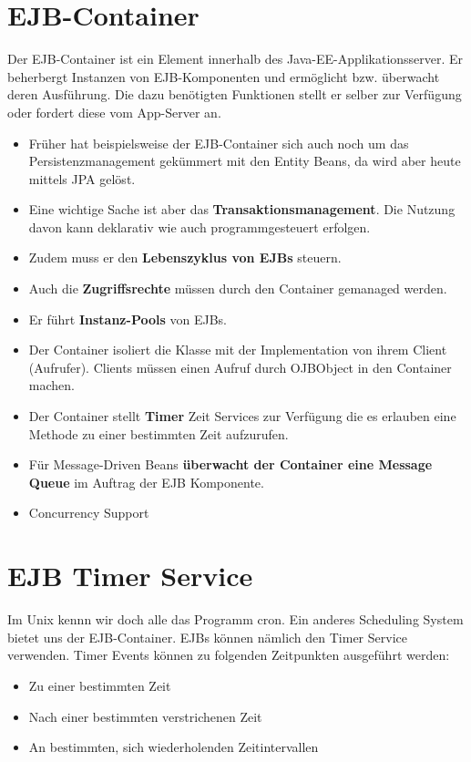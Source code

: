 \section{EJB-Container}
Der EJB-Container ist ein Element innerhalb des Java-EE-Applikationsserver. Er beherbergt Instanzen von EJB-Komponenten und ermöglicht bzw. überwacht deren Ausführung. Die dazu benötigten Funktionen stellt er selber zur Verfügung oder fordert diese vom App-Server an.

\begin{itemize}
	\item Früher hat beispielsweise der EJB-Container sich auch noch um das Persistenzmanagement gekümmert mit den Entity Beans, da wird aber heute mittels JPA gelöst.
	\item Eine wichtige Sache ist aber das \textbf{Transaktionsmanagement}.  Die Nutzung davon kann deklarativ wie auch programmgesteuert erfolgen.
	\item Zudem muss er den \textbf{Lebenszyklus von EJBs} steuern.
	\item Auch die \textbf{Zugriffsrechte} müssen durch den Container gemanaged werden.
	\item Er führt \textbf{Instanz-Pools} von EJBs.
	\item Der Container isoliert die Klasse mit der Implementation von ihrem Client (Aufrufer). Clients müssen einen Aufruf durch OJBObject in den Container machen.
	\item Der Container stellt \textbf{Timer} Zeit Services zur Verfügung die es erlauben eine Methode zu einer bestimmten Zeit aufzurufen.
	\item Für Message-Driven Beans\textbf{ überwacht der Container eine Message Queue }im  Auftrag der EJB Komponente. 
	\item Concurrency Support 
\end{itemize}

\section{EJB Timer Service}
Im Unix kennn wir doch alle das Programm cron. Ein anderes Scheduling System bietet uns der EJB-Container. EJBs können nämlich den Timer Service verwenden. Timer Events können zu folgenden Zeitpunkten ausgeführt werden:
\begin{itemize}
\item Zu einer bestimmten Zeit 
\item Nach einer bestimmten verstrichenen Zeit 
\item An bestimmten, sich wiederholenden Zeitintervallen 
\end{itemize}	

